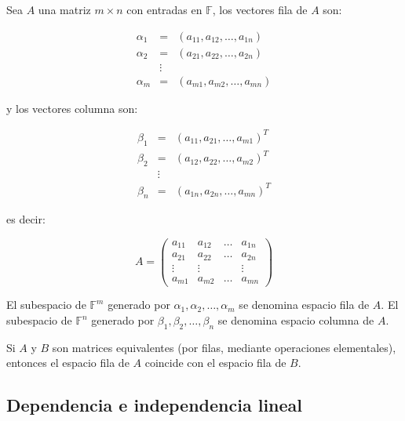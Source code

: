 		\begin{definicion}
			Sea $A$ una matriz $m \times n$ con entradas en $\mathbb{F}$, los vectores fila de $A$ son:

			\begin{eqnarray*}
				\alpha_1 & = & (a_{11}, a_{12}, \dots, a_{1n}) \\
				\alpha_2 & = & (a_{21}, a_{22}, \dots, a_{2n}) \\
				& \vdots & \\
				\alpha_m & = & (a_{m1}, a_{m2}, \dots, a_{mn})
			\end{eqnarray*}

			y los vectores columna son:

			\begin{eqnarray*}
				\beta_1 & = & (a_{11}, a_{21}, \dots, a_{m1})^T \\
				\beta_2 & = & (a_{12}, a_{22}, \dots, a_{m2})^T \\
				& \vdots & \\
				\beta_n & = & (a_{1n}, a_{2n}, \dots, a_{mn})^T
			\end{eqnarray*}

			es decir:

			\begin{equation*}
				A =
				\begin{pmatrix}
					a_{11} & a_{12} & \dots & a_{1n} \\
					a_{21} & a_{22} & \dots & a_{2n} \\
					\vdots & \vdots & & \vdots \\
					a_{m1} & a_{m2} & \dots & a_{mn}
				\end{pmatrix}
			\end{equation*}

			El subespacio de $\mathbb{F}^m$ generado por $\alpha_1, \alpha_2, \dots, \alpha_m$ se denomina espacio fila de $A$.
			El subespacio de $\mathbb{F}^n$ generado por $\beta_1, \beta_2, \dots, \beta_n$ se denomina espacio columna de $A$.
		\end{definicion}

		\begin{definicion}
			Si $A$ y $B$ son matrices equivalentes (por filas, mediante operaciones elementales), entonces el espacio fila de $A$ coincide con el espacio fila de $B$.
		\end{definicion}
 

	\subsection{Dependencia e independencia lineal}

